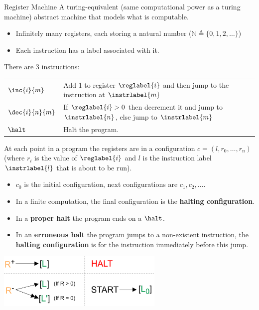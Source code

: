 \begin{definitionbox}{Register Machine}
	A turing-equivalent (same computational power as a turing machine) abstract machine that models what is computable.
	\begin{itemize}
		\item Infinitely many registers, each storing a natural number ($\mathbb{N} \triangleq \{0, 1, 2, \dots\}$)
		\item Each instruction has a label associated with it.
	\end{itemize}
	There are 3 instructions:
	\begin{center}
		\begin{tabular}{l l}
			$\inc{i}{m}$    & Add 1 to register $\reglabel{i}$ and then jump to the instruction at $\instrlabel{m}$               \\
			$\dec{i}{n}{m}$ & If $\reglabel{i} > 0$ then decrement it and jump to $\instrlabel{n}$, else jump to $\instrlabel{m}$ \\
			$\halt$         & Halt the program.
		\end{tabular}
	\end{center}
	At each point in a program the registers are in a configuration $c = (l, r_0, \dots, r_n)$ (where $r_i$ is the value of $\reglabel{i}$ and $l$ is the instruction label $\instrlabel{l}$ that is about to be run).
	\begin{itemize}
		\item $c_0$ is the initial configuration, next configurations are $c_1, c_2, \dots$.
		\item In a finite computation, the final configuration is the \textbf{halting configuration}.
		\item In a \textbf{proper halt} the program ends on a $\halt$.
		\item In an \textbf{erroneous halt} the program jumps to a non-existent instruction, the \textbf{halting configuration} is for the instruction immediately before this jump.
	\end{itemize}
	\begin{center}
		\includegraphics[width=0.6\textwidth]{register_machines/images/graphical_register_machine.drawio.png}
	\end{center}
\end{definitionbox}

